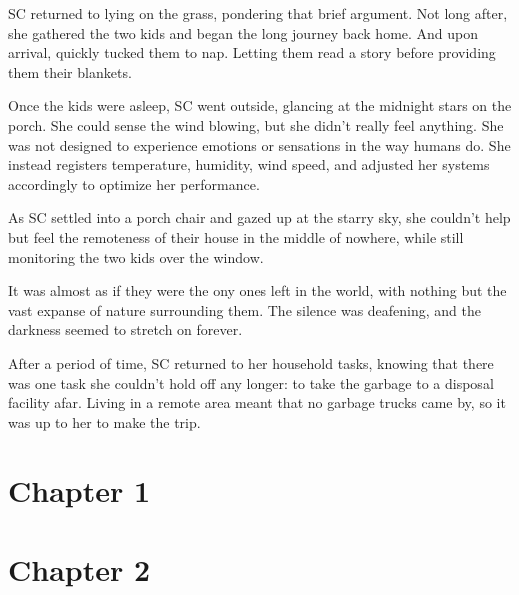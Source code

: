 \documentclass[12pt]{book}
\begin{document}
\clearpage

SC returned to lying on the grass, pondering that brief
argument. Not long after, she gathered the two kids and
began the long journey back home. And upon arrival,
quickly tucked them to nap. Letting them read a story
before providing them their blankets.

Once the kids were asleep, SC went outside, glancing at
the midnight stars on the porch. She could sense the wind
blowing, but she didn't really feel anything. She was not
designed to experience emotions or sensations in the way
humans do. She instead registers temperature, humidity,
wind speed, and adjusted her systems accordingly to
optimize her performance.

As SC settled into a porch chair and gazed up at the
starry sky, she couldn't help but feel the remoteness of
their house in the middle of nowhere, while still
monitoring the two kids over the window.

It was almost as if they were the ony ones left in the
world, with nothing but the vast expanse of nature
surrounding them. The silence was deafening, and the
darkness seemed to stretch on forever.

After a period of time, SC returned to her household
tasks, knowing that there was one task she couldn't hold
off any longer: to take the garbage to a disposal
facility afar. Living in a remote area meant that no
garbage trucks came by, so it was up to her to make the
trip.

\section*{Chapter 1}

\section*{Chapter 2}
\end{document}
